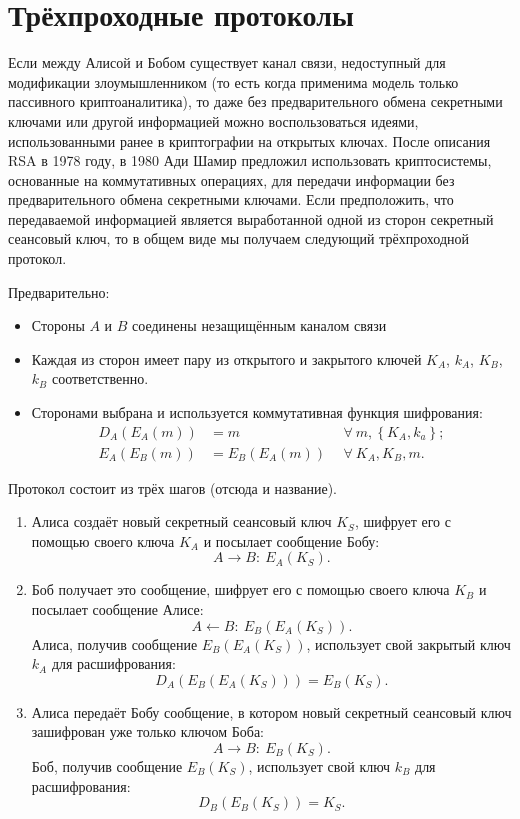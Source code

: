 \section{Трёхпроходные протоколы}

Если между Алисой и Бобом существует канал связи, недоступный для модификации злоумышленником (то есть когда применима модель только пассивного криптоаналитика), то даже без предварительного обмена секретными ключами или другой информацией можно воспользоваться идеями, использованными ранее в криптографии на открытых ключах. После описания RSA в 1978 году, в 1980 Ади Шамир предложил использовать криптосистемы, основанные на коммутативных операциях, для передачи информации без предварительного обмена секретными ключами. Если предположить, что передаваемой информацией является выработанной одной из сторон секретный сеансовый ключ, то в общем виде мы получаем следующий трёхпроходной протокол.

Предварительно:

\begin{itemize}
	\item Стороны $A$ и $B$ соединены незащищённым каналом связи
	\item Каждая из сторон имеет пару из открытого и закрытого ключей $K_A$, $k_A$, $K_B$, $k_B$ соответственно.
	\item Сторонами выбрана и используется коммутативная функция шифрования:
	\begin{align*}
		D_{A} \left( E_{A} \left( m \right) \right)	&= m		& ~~\forall ~ m, \left\{ K_A, k_a \right\}; \\
		E_{A} \left( E_{B} \left( m \right) \right)	&= E_B \left( E_A \left( m \right) \right) & ~~\forall ~ K_A, K_B, m.
	\end{align*}
\end{itemize}

Протокол состоит из трёх шагов (отсюда и название).
\begin{enumerate}
    \item Алиса создаёт новый секретный сеансовый ключ $K_S$, шифрует его с помощью своего ключа $K_A$ и посылает сообщение Бобу:
        \[ A \rightarrow B: ~ E_A \left( K_S \right). \]
    \item Боб получает это сообщение, шифрует его с помощью своего ключа $K_B$ и посылает сообщение Алисе:
        \[ A \leftarrow B: ~ E_B \left( E_A \left( K_S \right) \right). \]
    Алиса, получив сообщение $E_B \left( E_A \left( K_S \right) \right)$, использует свой закрытый ключ $k_A$ для расшифрования:
            \[ D_A \left( E_B \left( E_A \left( K_S \right) \right) \right) = E_B \left( K_S \right). \]
    \item Алиса передаёт Бобу сообщение, в котором новый секретный сеансовый ключ зашифрован уже только ключом Боба:
        \[ A \rightarrow B: ~ E_B \left( K_S \right). \]
    Боб, получив сообщение $E_B \left( K_S \right)$, использует свой ключ $k_B$ для расшифрования:
            \[ D_B \left( E_B \left( K_S \right) \right) = K_S. \]
\end{enumerate}

